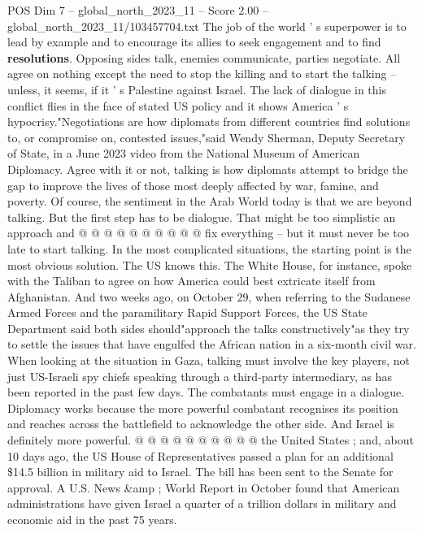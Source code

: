 \begin{textsample}{POS Dim 7 – global\_north\_2023\_11 – Score 2.00 – global\_north\_2023\_11/103457704.txt}  \label{ex:f7_pos_407}
The job of the world ' s superpower is to lead by example and to encourage its allies to seek engagement and to find \textbf{resolutions}.
Opposing sides talk, enemies communicate, parties negotiate.
All agree on nothing except the need to stop the killing and to start the talking -- unless, it seems, if it ' s Palestine against Israel.
The lack of dialogue in this conflict flies in the face of stated US policy and it shows America ' s hypocrisy."Negotiations are how diplomats from different countries find solutions to, or compromise on, contested issues,"said Wendy Sherman, Deputy Secretary of State, in a June 2023 video from the National Museum of American Diplomacy.
Agree with it or not, talking is how diplomats attempt to bridge the gap to improve the lives of those most deeply affected by war, famine, and poverty.
Of course, the sentiment in the Arab World today is that we are beyond talking.
But the first step has to be dialogue.
That might be too simplistic an approach and @ @ @ @ @ @ @ @ @ @ fix everything -- but it must never be too late to start talking.
In the most complicated situations, the starting point is the most obvious solution.
The US knows this.
The White House, for instance, spoke with the Taliban to agree on how America could best extricate itself from Afghanistan.
And two weeks ago, on October 29, when referring to the Sudanese Armed Forces and the paramilitary Rapid Support Forces, the US State Department said both sides should"approach the talks constructively"as they try to settle the issues that have engulfed the African nation in a six-month civil war.
When looking at the situation in Gaza, talking must involve the key players, not just US-Israeli spy chiefs speaking through a third-party intermediary, as has been reported in the past few days.
The combatants must engage in a dialogue.
Diplomacy works because the more powerful combatant recognises its position and reaches across the battlefield to acknowledge the other side.
And Israel is definitely more powerful. @ @ @ @ @ @ @ @ @ @ the United States ; and, about 10 days ago, the US House of Representatives passed a plan for an additional \$14.5 billion in military aid to Israel.
The bill has been sent to the Senate for approval.
A U.S.
News \&amp ; World Report in October found that American administrations have given Israel a quarter of a trillion dollars in military and economic aid in the past 75 years.

\end{textsample}
